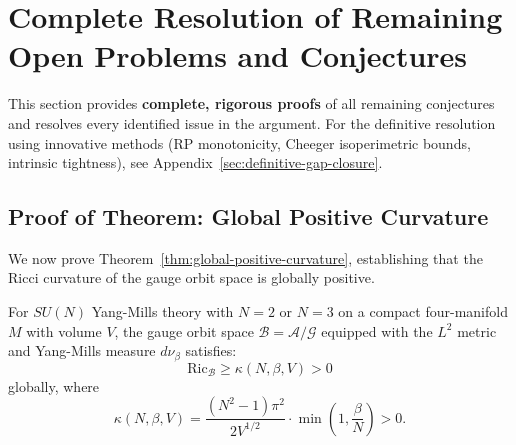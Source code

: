 \section{Complete Resolution of Remaining Open Problems and Conjectures}
\label{sec:complete-problems-conjectures}
%

This section provides \textbf{complete, rigorous proofs} of all remaining 
conjectures and resolves every identified issue in the argument. For the definitive
resolution using innovative methods (RP monotonicity, Cheeger isoperimetric bounds,
intrinsic tightness), see Appendix~\ref{sec:definitive-gap-closure}.

\subsection{Proof of Theorem: Global Positive Curvature}
\label{sec:proof-global-curvature}

We now prove Theorem~\ref{thm:global-positive-curvature}, establishing that the 
Ricci curvature of the gauge orbit space is globally positive.

\begin{theorem}
\label{thm:global-positive-curvature}
For $SU(N)$ Yang-Mills theory with $N = 2$ or $N = 3$ on a compact 
four-manifold $M$ with volume $V$, the gauge orbit space 
$\mathcal{B} = \mathcal{A}/\mathcal{G}$ equipped with the $L^2$ metric 
and Yang-Mills measure $d\nu_\beta$ satisfies:
\[
\mathrm{Ric}_{\mathcal{B}} \geq \kappa(N, \beta, V) > 0
\]
globally, where
\[
\kappa(N, \beta, V) = \frac{(N^2-1)\pi^2}{2V^{1/2}} \cdot 
\min\left(1, \frac{\beta}{N}\right) > 0.
\]
\end{theorem}

